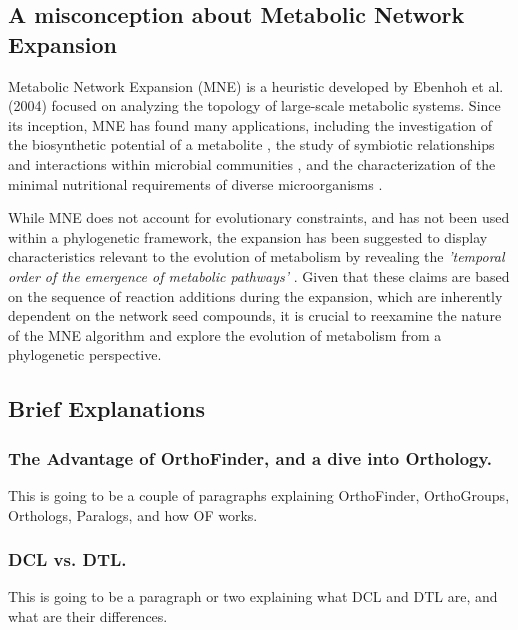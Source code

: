 \subsection*{A misconception about Metabolic Network Expansion}

Metabolic Network Expansion (MNE) is a heuristic developed by Ebenhoh et al. (2004) \cite{ebenhoh2004} focused on analyzing the topology of large-scale metabolic systems. Since its inception, MNE has found many applications, including the investigation of the biosynthetic potential of a metabolite \cite{handorf2005, ebenhoh2006a}, the study of symbiotic relationships and interactions within microbial communities \cite{christian2007, frioux2018}, and the characterization of the minimal nutritional requirements of diverse microorganisms \cite{handorf2008,borenstein2008}.

While MNE does not account for evolutionary constraints, and has not been used within a phylogenetic framework, the expansion has been suggested to display characteristics relevant to the evolution of metabolism \cite{handorf2005, ebenhoh2006a, kreimer2008} by revealing the \textit{'temporal order of the emergence of metabolic pathways'} \cite{handorf2005}. Given that these claims are based on the sequence of reaction additions during the expansion, which are inherently dependent on the network seed compounds, it is crucial to reexamine the nature of the MNE algorithm and explore the evolution of metabolism from a phylogenetic perspective.


\subsection*{Brief Explanations}

\subsubsection*{The Advantage of OrthoFinder, and a dive into Orthology.}
This is going to be a couple of paragraphs explaining OrthoFinder, OrthoGroups, Orthologs, Paralogs, and how OF works.

\subsubsection*{DCL vs. DTL.}
This is going to be a paragraph or two explaining what DCL and DTL are, and what are their differences.


